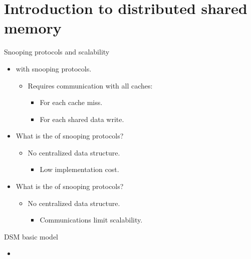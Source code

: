 \section{Introduction to distributed shared memory}

\begin{frame}[t]{Snooping protocols and scalability}
\begin{itemize}
  \item {} with snooping protocols.
    \begin{itemize}
      \item Requires communication with all caches:
        \begin{itemize}
          \item For each cache miss.
          \item For each shared data write.
        \end{itemize}
    \end{itemize}

  \item What is the  of snooping protocols?
    \begin{itemize}
      \item No centralized data structure.
        \begin{itemize}
          \item Low implementation cost.
        \end{itemize}
    \end{itemize}

  \item What is the  of snooping protocols?
    \begin{itemize}
      \item No centralized data structure.
        \begin{itemize}
          \item Communications limit scalability.
        \end{itemize}
    \end{itemize}
\end{itemize}
\end{frame}

\begin{frame}{DSM basic model}
\makebox[\textwidth][c]{

}
\begin{itemize}
  \item {}
\end{itemize}
\end{frame}

